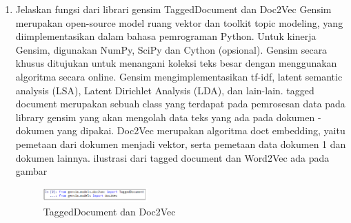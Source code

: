 \begin{enumerate}
    \item Jelaskan fungsi dari librari gensim TaggedDocument dan Doc2Vec 
    Gensim merupakan open-source model ruang vektor dan toolkit topic modeling, yang diimplementasikan dalam bahasa pemrograman Python. Untuk kinerja Gensim, digunakan NumPy, SciPy dan Cython (opsional). Gensim secara khusus ditujukan untuk menangani koleksi teks besar dengan menggunakan algoritma secara online. Gensim mengimplementasikan tf-idf, latent semantic analysis (LSA), Latent Dirichlet Analysis (LDA), dan lain-lain. 
    \hfill\break
    tagged document merupakan sebuah class yang terdapat pada pemrosesan data pada library gensim yang akan mengolah data teks yang ada pada dokumen - dokumen yang dipakai.
    \hfill\break
    Doc2Vec merupakan algoritma doct embedding, yaitu pemetaan dari dokumen menjadi vektor, serta pemetaan data dokumen 1 dan dokumen lainnya.
    \hfill\break
    ilustrasi dari tagged document dan Word2Vec ada pada gambar
    \begin{figure}[H]
        \includegraphics[width=4cm]{figures/1174096/tugas5/praktek3.PNG}
        \centering
        \caption{TaggedDocument dan Doc2Vec}
    \end{figure}


\end{enumerate}
